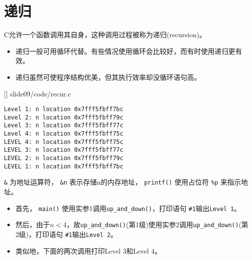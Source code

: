 \section{递归}

\begin{frame}[fragile]\ft{\secname}
C允许一个函数调用其自身，这种调用过程被称为递归(recursion)。 
\vspace{0.1in}

\begin{itemize}
\item 递归一般可用循环代替。有些情况使用循环会比较好，而有时使用递归更有效。\\[0.1in]
\item 递归虽然可使程序结构优美，但其执行效率却没循环语句高。
\end{itemize}
\end{frame}


\begin{frame}\ft{\secname}
  
  []
  {slide09/code/recur.c}
\end{frame}


\begin{frame}[fragile]\ft{\secname}
\begin{lstlisting}[backgroundcolor=\color{red!10}]
Level 1: n location 0x7fff5fbff7bc
Level 2: n location 0x7fff5fbff79c
Level 3: n location 0x7fff5fbff77c
Level 4: n location 0x7fff5fbff75c
LEVEL 4: n location 0x7fff5fbff75c
LEVEL 3: n location 0x7fff5fbff77c
LEVEL 2: n location 0x7fff5fbff79c
LEVEL 1: n location 0x7fff5fbff7bc
\end{lstlisting} \pause 


 \lstinline|&| 为地址运算符， \lstinline|&n| 表示存储n的内存地址， \lstinline|printf()| 使用占位符 \lstinline|%p| 来指示地址。
\end{frame}


\begin{frame}[fragile]
\begin{itemize}
\item 首先， \lstinline|main()| 使用实参1调用\lstinline|up_and_down()|，打印语句 \lstinline|#1|输出\lstinline|Level 1|。\\[0.1in]
\item 然后，由于$n<4$，故\lstinline|up_and_down()|(第1级)使用实参2调用\lstinline|up_and_down()|(第2级)，打印语句 \lstinline|#1|输出\lstinline|Level 2|。\\[0.1in]
\item 类似地，下面的两次调用打印{\tf Level 3}和{\tf Level 4}。
\end{itemize}
\end{frame}

